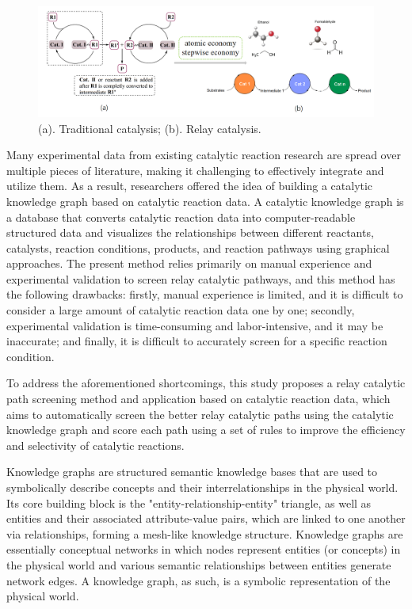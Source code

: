 \documentclass[%
 aip,
 jmp,%
 amsmath,amssymb,
 reprint,%
]{revtex4-2}
\begin{document}
\begin{figure}[htbp]
    \centering
    \includegraphics[width=1\textwidth]{figure/1.png}
    \caption{ (a). Traditional catalysis; (b). Relay catalysis. }
    \label{ Fig.1 }
\end{figure}

Many experimental data from existing catalytic reaction research are spread over multiple pieces of literature, making it challenging to effectively integrate and utilize them. As a result, researchers offered the idea of building a catalytic knowledge graph\cite{segler2017modelling, gao2023revisiting} based on catalytic reaction data. A catalytic knowledge graph is a database that converts catalytic reaction data into computer-readable structured data and visualizes the relationships between different reactants, catalysts, reaction conditions, products, and reaction pathways using graphical approaches. The present method relies primarily on manual experience and experimental validation to screen relay catalytic pathways, and this method has the following drawbacks: firstly, manual experience is limited, and it is difficult to consider a large amount of catalytic reaction data one by one; secondly, experimental validation is time-consuming and labor-intensive, and it may be inaccurate; and finally, it is difficult to accurately screen for a specific reaction condition.

To address the aforementioned shortcomings, this study proposes a relay catalytic path screening method and application based on catalytic reaction data, which aims to automatically screen the better relay catalytic paths using the catalytic knowledge graph and score each path using a set of rules to improve the efficiency and selectivity of catalytic reactions.

Knowledge graphs\cite{ehrlinger2016towards} are structured semantic knowledge bases that are used to symbolically describe concepts and their interrelationships in the physical world. Its core building block is the "entity-relationship-entity" triangle, as well as entities and their associated attribute-value pairs, which are linked to one another via relationships, forming a mesh-like knowledge structure. Knowledge graphs are essentially conceptual networks in which nodes represent entities (or concepts) in the physical world and various semantic relationships between entities generate network edges. A knowledge graph, as such, is a symbolic representation of the physical world.
\end{document}
